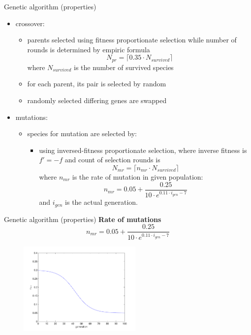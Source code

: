\documentclass{beamer}
\begin{document}
\begin{frame}{Genetic algorithm (properties)}
\begin{itemize}
	\item crossover:
	\begin{itemize}
		\item parents selected using fitness proportionate selection
		 while number of rounds is determined by empiric formula
		\[ N_{pr} = \lceil 0.35\cdot N_{survived} \rceil \]
		where $ N_{survived} $ is the number of survived species
		\item for each parent, its pair is selected by random
		\item randomly selected differing genes are swapped
	\end{itemize}
	\item mutations:\pause
	\begin{itemize}
		\item species for mutation are selected by:
		\begin{itemize}
			\item using inversed-fitness proportionate selection\pause, where inverse fitness is
			$ f'=-f  $ 
			and count of selection rounds is
			\[ N_{mr} = \lceil n_{mr}\cdot N_{survived} \rceil \] \pause
			where 
			$ n_{mr} $  is the rate of mutation in given population: \pause	
			\[ n_{mr} = 0.05+\dfrac{0.25}{10\cdot e^{0.11\cdot i_{gen}-7}}\]
			and
			$ i_{gen} $ is the actual generation.
		\end{itemize}
	\end{itemize}
\end{itemize}
\end{frame}

\begin{frame}{Genetic algorithm (properties)}
	\centering
	\textbf{Rate of mutations}\\
	\[ n_{mr} = 0.05+\dfrac{0.25}{10\cdot e^{0.11\cdot i_{gen}-7}}\]
	\begin{figure}[h] %
		\includegraphics[width=60mm]{mut_r}
		\label{mut_r}
	\end{figure}
\end{frame}
\end{document}
